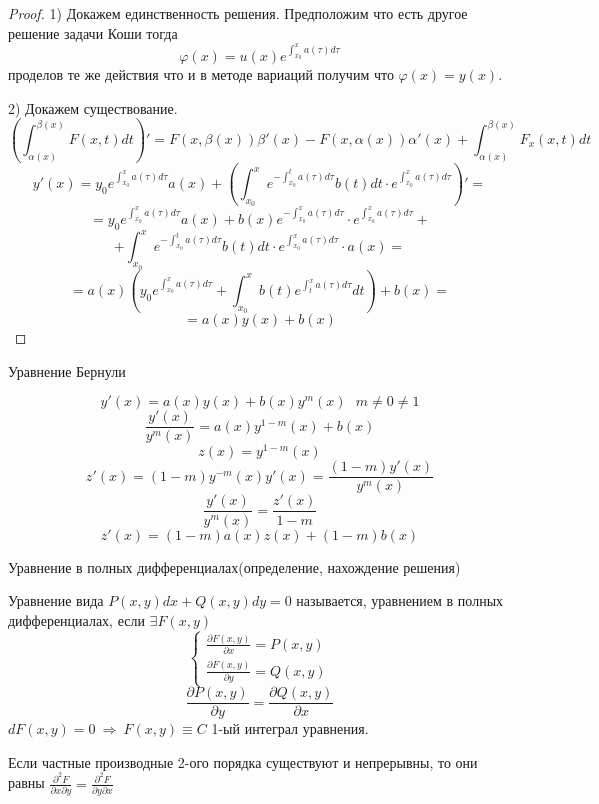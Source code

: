 \begin{proof}
  1) Докажем единственность решения. Предположим что есть другое решение задачи
  Коши тогда
  $$
  \varphi(x) = u(x) e^{\int_{x_0}^x a(\tau)d\tau}
  $$
  проделов те же действия что и в методе вариаций получим что
  $\varphi(x) = y(x)$.

  2) Докажем существование.
  $$
  \left( \int_{\alpha(x)}^{\beta(x)} F(x, t) dt \right)' =
  F(x, \beta(x)) \beta'(x) - F(x, \alpha(x)) \alpha'(x) +
  \int_{\alpha(x)}^{\beta(x)} F_x(x, t)dt
  $$
  $$
  y'(x) = y_0 e^{\int_{x_0}^x a(\tau) d\tau} a(x) + \left( \int_{x_0}^x
  e^{-\int_{x_0}^t a(\tau) d\tau} b(t)dt \cdot
  e^{\int_{x_0}^x a(\tau)d\tau} \right)' =
  $$
  $$
  = y_0 e^{\int_{x_0}^x a(\tau)d\tau} a(x) + b(x)
  e^{-\int_{x_0}^x a(\tau) d\tau} \cdot e^{\int_{x_0}^x a(\tau) d\tau} +
  $$
  $$
  + \int_{x_0}^x e^{-\int_{x_0}^t a(\tau) d\tau} b(t) dt \cdot
  e^{\int_{x_0}^x a(\tau) d\tau} \cdot a(x)=
  $$
  $$
  = a(x) \left( y_0 e^{\int_{x_0}^x a(\tau) d\tau} + \int_{x_0}^x b(t)
  e^{\int_t^x a(\tau) d\tau} dt \right) + b(x) =
  $$
  $$
  = a(x)y(x) + b(x)
  $$
\end{proof}

\begin{title}[\Large]
  Уравнение Бернули
\end{title}

\begin{block}
  $$
  y'(x) = a(x)y(x) + b(x)y^m(x) ~~~ m \not= 0 \not= 1
  $$
  $$
  \frac{y'(x)}{y^m(x)} = a(x) y^{1 - m}(x) + b(x)
  $$
  $$
  z(x) = y^{1 - m}(x)
  $$
  $$
  z'(x) = (1 - m) y^{-m}(x) y'(x) = \frac{(1-m)y'(x)}{y^m(x)}
  $$
  $$
  \frac{y'(x)}{y^m(x)} = \frac{z'(x)}{1 - m}
  $$
  $$
  z'(x) = (1 - m) a(x)z(x) + (1 - m)b(x)
  $$
\end{block}

\begin{title}[\Large]
  Уравнение в полных дифференциалах(определение, нахождение решения)
\end{title}

\begin{define}
  Уравнение вида $P(x, y)dx + Q(x, y)dy = 0$ называется, уравнением в полных
  дифференциалах, если $\exists F(x, y)$
  $$
  \left\{
  \begin{array}{l}
    \frac{\partial F(x, y)}{\partial x} = P(x, y) \\
    \frac{\partial F(x, y)}{\partial y} = Q(x, y)
  \end{array}
  \right.
  $$
  $$
  \frac{\partial P(x, y)}{\partial y} = \frac{\partial Q(x, y)}{\partial x}
  $$
  $dF(x, y) = 0 ~ \Rightarrow ~ F(x, y) \equiv C$ 1-ый интеграл уравнения.

  Если частные производные 2-ого порядка существуют и непрерывны, то они равны
  $\frac{\partial^2 F}{\partial x \partial y} =
  \frac{\partial^2 F}{\partial y \partial x}$
\end{define}

